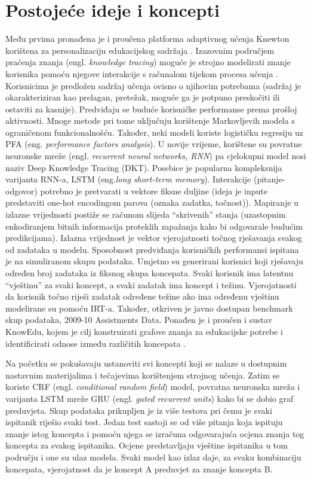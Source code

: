 \chapter{Postojeće ideje i koncepti}
Među prvima pronađena je i proučena platforma adaptivnog učenja Knewton korištena za personalizaciju edukacijskog sadržaja \citep{ct1}. 
\newline
\newline
Izazovnim područjem praćenja znanja (engl. \textit{knowledge tracing}) moguće je strojno modelirati znanje korisnika pomoću njegove interakcije s računalom tijekom procesa učenja \citep{ct2}. Korisnicima je predložen sadržaj učenja ovisno o njihovim potrebama (sadržaj je okarakteriziran kao prelagan, pretežak, moguće ga je potpuno preskočiti ili ostaviti za kasnije). Predviđaju se buduće korisničke performanse prema prošloj aktivnosti. Mnoge metode pri tome uključuju korištenje Markovljevih modela s ograničenom funkcionalnošću. Također, neki modeli koriste logističku regresiju uz PFA (eng. \textit{performance factors analysis}). U novije vrijeme, korištene su povratne neuronske mreže (engl. \textit{recurrent neural networks, RNN}) pa cjelokupni model nosi naziv Deep Knowledge Tracing (DKT). Posebice je popularna kompleksnija varijanta RNN-a, LSTM (eng.\textit{long short-term memory}). Interakcije (pitanje-odgovor) potrebno je pretvarati u vektore fiksne duljine (ideja je inpute predstaviti one-hot encodingom parova (oznaka zadatka, točnost)). Mapiranje u izlazne vrijednosti postiže se računom slijeda “skrivenih” stanja (uzastopnim enkodiranjem bitnih informacija proteklih zapažanja kako bi odgovarale budućim predikcijama). Izlazna vrijednost je vektor vjerojatnosti točnog rješavanja svakog od zadataka u modelu. 
Sposobnost predviđanja korisničkih performansi ispitana je na simuliranom skupu podataka. Umjetno su generirani korisnici koji rješavaju određen broj zadataka iz fiksnog skupa koncepata. Svaki korisnik ima latentnu “vještinu” za svaki koncept, a svaki zadatak ima koncept i težinu. Vjerojatnosti da korisnik točno riješi zadatak određene težine ako ima određenu vještinu modelirane su pomoću IRT-a. Također, otkriven je javno dostupan benchmark skup podataka, 2009-10 Assistments Data.
\newline
\newline
Ponađen je i proučen i sustav KnowEdu, kojem je cilj konstruirati grafove znanja za edukacijske potrebe i identificirati odnose između različitih koncepata \citep{ct3}.

Na početku se pokušavaju ustanoviti svi koncepti koji se nalaze u dostupnim nastavnim materijalima i tečajevima korištenjem strojnog učenja. Zatim se koriste CRF (engl. \textit{conditional random field}) model, povratna neuronska mreža i varijanta LSTM mreže GRU (engl. \textit{gated recurrent units}) kako bi se dobio graf preduvjeta. Skup podataka prikupljen je iz više testova pri čemu je svaki ispitanik riješio svaki test. Jedan test sastoji se od više pitanja koja ispituju znanje istog koncepta i pomoću njega se izračuna odgovarajuća ocjena znanja tog koncepta za svakog ispitanika. Ocjene predstavljaju vještine ispitanika u tom području i one su ulaz modela. Svaki model kao izlaz daje, za svaku kombinaciju koncepata, vjerojatnost da je koncept A preduvjet za znanje koncepta B.